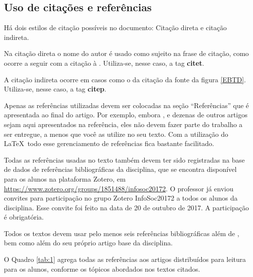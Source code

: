 \documentclass[12pt]{article}
\begin{document}
	\subsection{Uso de citações e referências}

	Há dois estilos de citação possíveis no documento: Citação direta e citação indireta. 
	
	Na citação direta o nome do autor é usado como sujeito na frase de citação, como ocorre a seguir com a citação à \citet{gt_interministerial_port._n_842/2017_estrategia_2017}. Utiliza-se, nesse caso, a tag \textbf{citet}.
	
	A citação indireta ocorre em casos como o da citação da fonte da figura \ref{EBTD}. Utiliza-se, nesse caso, a tag \textbf{citep}.
			
	Apenas as referências utilizadas devem ser colocadas na seção ``Referências'' que é apresentada ao final do artigo. 
	Por exemplo, embora \cite{adams_view_2016}, \cite{al-garadi_cybercrime_2016} e dezenas de outros artigos sejam aqui apresentados na referência, 
	eles não devem fazer parte do trabalho a ser entregue, a menos que você as utilize no seu texto. 
	Com a utilização do \LaTeX\ todo esse gerenciamento de referências fica bastante facilitado.
	
	Todas as referências usadas no texto também devem ter sido registradas na base de dados de referências bibliográficas da disciplina, que se encontra disponível para os alunos na plataforma Zotero, em \href{https://www.zotero.org/groups/1851488/infosoc20172}{https://www.zotero.org/groups/1851488/infosoc20172}. O professor já enviou convites para participação no grupo Zotero InfoSoc20172 a todos os alunos da disciplina. Esse convite foi feito na data de 20 de outubro de 2017. A participação é obrigatória.
	
	Todos os textos devem usar pelo menos seis referências bibliográficas além de \citep{jones_doing_2016,fernandes_organizacao_2016,vickery_information_1987}, bem como além do seu próprio artigo base da disciplina.
	
	O Quadro \ref{tab:1} agrega todas as referências aos artigos distribuídos para leitura para os alunos, conforme os tópicos abordados nos textos citados.
	
\end{document}

